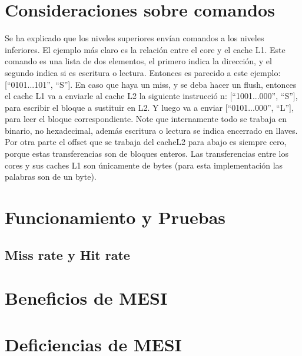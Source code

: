\documentclass {article}
\begin{document}
\section{Consideraciones sobre comandos}
Se ha explicado que los niveles superiores envían comandos a los niveles inferiores. El ejemplo más
claro es la relación entre el core y el cache L1. Este comando es una lista de dos elementos, el
primero indica la dirección, y el segundo indica si es escritura o lectura. Entonces es parecido a
este ejemplo: [``0101...101'', ``{S}'']. En caso que haya un miss, y se deba hacer un flush, entonces el
cache L1 va a enviarle al cache L2 la siguiente instrucci\'o n: [``1001...000'', ``{S}''], para escribir
el bloque a sustituir en L2. Y luego va a enviar [``0101...000'', ``{L}''], para leer el bloque
correspondiente. Note que internamente todo se trabaja en binario, no hexadecimal, además escritura
o lectura se indica encerrado en llaves. Por otra parte el offset que se trabaja del cacheL2 para
abajo es siempre cero, porque estas transferencias son de bloques enteros. Las transferencias entre
los cores y sus caches L1 son únicamente de bytes (para esta implementación las palabras son de un byte). 


\section{Funcionamiento y Pruebas}

\subsection{Miss rate y Hit rate}

\section{Beneficios de MESI}

\section{Deficiencias de MESI}
\end{document}
